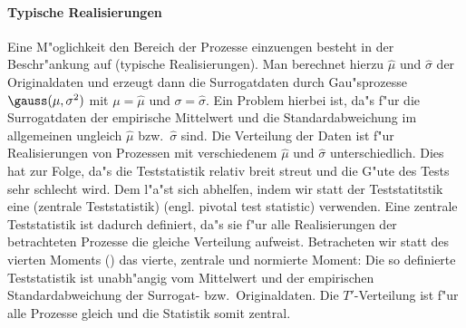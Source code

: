 \paragraph{Typische Realisierungen}
Eine M"oglichkeit den Bereich der Prozesse einzuengen besteht in der Beschr"ankung auf
\begriff(typische Realisierungen). Man berechnet hierzu $\hat\mu$ und $\hat\sigma$ der Originaldaten
und erzeugt dann die Surrogatdaten durch Gau"sprozesse $\gauss(\mu,\sigma^2)$ mit
$\mu=\hat\mu$ und $\sigma=\hat\sigma$. Ein Problem hierbei ist, da"s f"ur die
Surrogatdaten der empirische Mittelwert und die Standardabweichung im allgemeinen ungleich
$\hat\mu$ bzw.\ $\hat\sigma$ sind\footnotemark. Die Verteilung der Daten ist f"ur Realisierungen von 
Prozessen mit verschiedenem $\hat\mu$ und $\hat\sigma$ unterschiedlich. Dies hat zur Folge, da"s die Teststatistik relativ
breit streut und die G"ute des Tests sehr schlecht wird. Dem l"a"st sich
abhelfen, indem wir statt der Teststatitstik  eine
\begriff(zentrale Teststatistik) (engl. pivotal test statistic) verwenden. Eine zentrale
Teststatistik ist dadurch definiert, da"s sie f"ur
alle Realisierungen der betrachteten Prozesse die gleiche Verteilung aufweist. 
Betracheten wir statt des vierten Moments () das vierte, zentrale
und normierte Moment:
Die so definierte Teststatistik ist unabh"angig vom Mittelwert und der empirischen
Standardabweichung der Surrogat- bzw.\ Originaldaten. Die $T'$-Verteilung ist f"ur alle
Prozesse gleich und die Statistik somit zentral.



